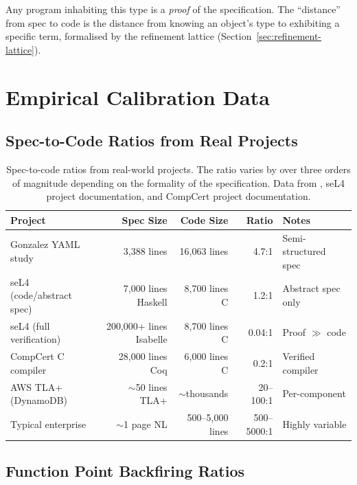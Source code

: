 \documentclass[11pt, a4paper, logo, copyright]{googledeepmind}
\begin{document}
Any program inhabiting this type is a \emph{proof} of the specification. The ``distance'' from spec to code is the distance from knowing an object's type to exhibiting a specific term, formalised by the refinement lattice (Section~\ref{sec:refinement-lattice}).


\section{Empirical Calibration Data}
\label{app:empirical}

\subsection{Spec-to-Code Ratios from Real Projects}

\begin{table}[H]
\centering
\small
\begin{tabular}{lrrrl}
\toprule
\textbf{Project} & \textbf{Spec Size} & \textbf{Code Size} & \textbf{Ratio} & \textbf{Notes} \\
\midrule
Gonzalez YAML study & 3,388 lines & 16,063 lines & 4.7:1 & Semi-structured spec \\
seL4 (code/abstract spec) & 7,000 lines Haskell & 8,700 lines C & 1.2:1 & Abstract spec only \\
seL4 (full verification) & 200,000+ lines Isabelle & 8,700 lines C & 0.04:1 & Proof $\gg$ code \\
CompCert C compiler & 28,000 lines Coq & 6,000 lines C & 0.2:1 & Verified compiler \\
AWS TLA+ (DynamoDB) & $\sim$50 lines TLA+ & $\sim$thousands & 20--100:1 & Per-component \\
Typical enterprise & $\sim$1 page NL & 500--5,000 lines & 500--5000:1 & Highly variable \\
\bottomrule
\end{tabular}
\caption{Spec-to-code ratios from real-world projects. The ratio varies by over three orders of magnitude depending on the formality of the specification. Data from \citet{newcombe2015amazon, gonzalez2026spec}, seL4 project documentation, and CompCert project documentation.}
\label{tab:spec-code-ratios}
\end{table}

\subsection{Function Point Backfiring Ratios}
\end{document}

